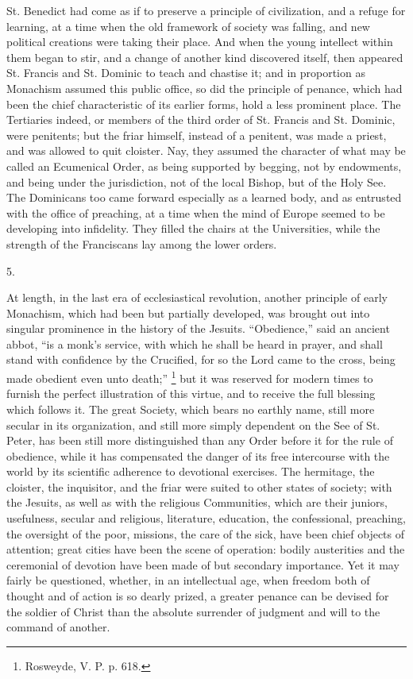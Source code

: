 St. Benedict had come as if to preserve a principle of
civilization, and a refuge for learning, at a time when the old
framework of society was falling, and new political creations were
taking their place. And when the young intellect within them began to
stir, and a change of another kind discovered itself, then appeared
St. Francis and St. Dominic to teach and chastise it; and in
proportion as Monachism assumed this public office, so did the
principle of penance, which had been the chief characteristic of its
earlier forms, hold a less prominent place. The Tertiaries indeed, or
members of the third order of St. Francis and St. Dominic, were
penitents; but the friar himself, instead of a penitent, was made a
priest, and was allowed to quit cloister. Nay, they assumed the
character of what may be called an Ecumenical Order, as being
supported by begging, not by endowments, and being under the
jurisdiction, not of the local Bishop, but of the Holy See. The
Dominicans too came forward especially as a learned body, and as
entrusted with the office of preaching, at a time when the mind of
Europe seemed to be developing into infidelity. They filled the chairs
at the Universities, while the strength of the Franciscans lay among
the lower orders.

5.

At length, in the last era of ecclesiastical revolution, another
principle of early Monachism, which had been but partially developed,
was brought out into singular prominence in the history of the
Jesuits. ``Obedience,'' said an ancient abbot, ``is a
monk's service, with which he shall be heard in prayer, and shall
stand with confidence by the Crucified, for so the Lord came to the
cross, being made obedient even unto death;'' \footnote{Rosweyde, V. P. p. 618.} but it
was reserved for modern times to furnish the perfect illustration of
this virtue, and to receive the full blessing which follows it. The
great Society, which bears no earthly name, still more secular in its
organization, and still more simply dependent on the See of St. Peter,
has been still more distinguished than any Order before it for the
rule of obedience, while it has compensated the danger of its free
intercourse with the world by its scientific adherence to devotional
exercises. The hermitage, the cloister, the inquisitor, and the friar
were suited to other states of society; with the Jesuits, as well as
with the religious Communities, which are their juniors, usefulness,
secular and religious, literature, education, the confessional,
preaching, the oversight of the poor, missions, the care of the sick,
have been chief objects of attention; great cities have been the scene
of operation: bodily austerities and the ceremonial of devotion have
been made of but secondary importance. Yet it may fairly be
questioned, whether, in an intellectual age, when freedom both of
thought and of action is so dearly prized, a greater penance can be
devised for the soldier of Christ than the absolute surrender of
judgment and will to the command of another.

